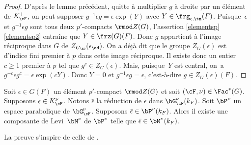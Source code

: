 \begin{proof}
D'après le lemme précédent, quitte à multiplier $g$ à droite par un élément de $K_{\cF}^+$, on peut supposer $g^{-1}\epsilon g=\epsilon \exp(Y)$ avec $Y\in \frg_{\epsilon,\tn}(F)$. Puisque~$\epsilon$ et $g^{-1}\epsilon g$ sont tous deux $p'$-compacts $\rmod Z(G)$, l'assertion \ref{elementsp}\,\eqref{elementsp2} entraîne que \hbox{$Y\in \frz(G)(F)$}. Donc $g$ appartient à l'image réciproque dans $G$ de $Z_{G_{\AD}}(\epsilon_{\ad})$. On a déjà dit que le groupe $Z_{G}(\epsilon)$ est d'indice fini premier à $p$ dans cette image réciproque. Il existe donc un entier $c\geq1$ premier à $p$ tel que $g^c\in Z_{G}(\epsilon)$. Mais, puisque~$Y$ est central, on~a $g^{-c}\epsilon g^c=\epsilon \exp(cY)$. Donc $Y=0$ et $g^{-1}\epsilon g=\epsilon$, c'est-à-dire $g\in Z_{G}(\epsilon)(F)$.
\end{proof}

\label{p'unlemme}
\begin{lem*}
Soit $\epsilon\in G(F)$ un élément $p'$-compact $\rmod Z(G)$ et soit $(\cF,\nu)\in \Fac^*(G)$. Supposons $\epsilon\in K_{\cF}^{\nu}$. Notons $\bar{\epsilon}$ la réduction de $\epsilon$ dans $\bG_{\cF}^{\nu}(k_{F})$. Soit $\bP^{\nu}$ un espace parabolique de $\bG_{\cF}^{\nu}$. Supposons $\bar{\epsilon}\in \bP^{\nu}(k_{F})$. Alors il existe une composante de Levi~$\bM^{\nu}$ de $\bP^{\nu}$ telle que $\bar{\epsilon}\in \bM^{\nu}(k_{F})$.
\end{lem*}

La preuve s'inspire de celle de \cite[Lem.\,9]{P}.

